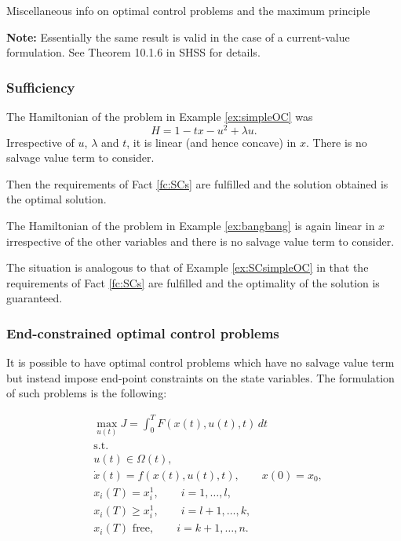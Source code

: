 \documentclass[10pt]{beamer}
\theoremstyle{definition}
\begin{document}
\begin{section}{Miscellaneous info on optimal control problems and the maximum principle}
\begin{frame}[fragile]
\textbf{Note:} Essentially the same result is valid in the case of a current-value formulation. See Theorem 10.1.6 in SHSS for details.
\end{frame}

\begin{frame}[fragile]
\frametitle{Sufficiency}
\begin{example}
The Hamiltonian of the problem in Example \ref{ex:simpleOC} was \[ H = 1-tx-u^2+\lambda u. \] Irrespective of $ u $, $ \lambda $ and $ t $, it is linear (and hence concave) in $ x $. There is no salvage value term to consider.

Then the requirements of Fact \ref{fc:SCs} are fulfilled and the solution obtained is the optimal solution.
\label{ex:SCsimpleOC}
\end{example}

\begin{example}
The Hamiltonian of the problem in Example \ref{ex:bangbang} is again linear in $ x $ irrespective of the other variables and there is no salvage value term to consider.

The situation is analogous to that of Example \ref{ex:SCsimpleOC} in that the requirements of Fact \ref{fc:SCs} are fulfilled and the optimality of the solution is guaranteed.
\label{ex:SCbangbang}
\end{example}
\end{frame}

\begin{frame}[fragile]
\frametitle{End-constrained optimal control problems}
It is possible to have optimal control problems which have no salvage value term but instead impose end-point constraints on the state variables. The formulation of such problems is the following: 

\begin{equation}
\begin{split}
& \max_{u(t)} J = \int_{0}^{T}F(x(t),u(t),t)\,dt  \\
&\text{s.t.}\\
& u(t)\in \Omega(t) ,\\
& \dot{x}(t)=f(x(t),u(t),t),\qquad x(0)=x_0,\\
& x_i(T) = x^1_i,\qquad i=1,\ldots,l,\\
& x_i(T) \geq x^1_i,\qquad i=l+1,\ldots,k,\\
& x_i(T) \text{ free},\qquad i=k+1,\ldots,n.\\
\end{split}
\label{eq:endconstrOC}
\end{equation}
\end{frame}


\end{section}
\end{document}
